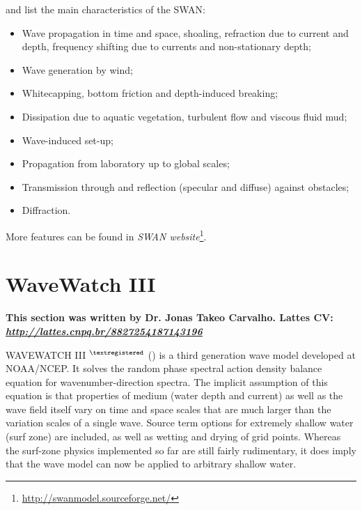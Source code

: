 \noindent \textcite{Dasilva2013} and \textcite{Booij1999,Booij1996} list the main characteristics of the SWAN:
\bigskip

\begin{itemize}
\item Wave propagation in time and space, shoaling, refraction due to current and depth, frequency shifting due to currents and non-stationary depth;
\item Wave generation by wind;
\item Whitecapping, bottom friction and depth-induced breaking;
\item Dissipation due to aquatic vegetation, turbulent flow and viscous fluid mud;
\item Wave-induced set-up;
\item Propagation from laboratory up to global scales;
\item Transmission through and reflection (specular and diffuse) against obstacles;
\item Diffraction.
\end{itemize}
\bigskip

More features can be found in \textcolor{bleu_cite}{\textit{SWAN website}\footnote{\textcolor{bleu_cite}{\href{http://swanmodel.sourceforge.net/}{http://swanmodel.sourceforge.net/}}}}.



\section{WaveWatch III}\label{ww3secao}
\bigskip

\noindent \textbf{This section was written by Dr. Jonas Takeo Carvalho.  \newline Lattes CV: \textit{\textcolor{bleu_cite}{\href{http://lattes.cnpq.br/8827254187143196}{http://lattes.cnpq.br/8827254187143196}}}} 
\bigskip

\noindent WAVEWATCH III $^{\tiny{\textregistered}}$ (\cite{Tolman1997,Tolman1999,Tolman2009,Tolman2014,WW32016}) is a third generation wave model developed at NOAA/NCEP.  
It solves the random phase spectral action density balance equation for wavenumber-direction spectra. The implicit assumption of this equation is that 
properties of medium (water depth and current) as well as the wave field itself vary on time and space scales that are much larger than the variation 
scales of a single wave. Source term options for extremely shallow water (surf zone) are included, as well as wetting and drying of grid points. 
Whereas the surf-zone physics implemented so far are still fairly rudimentary, it does imply that the wave model can now be applied to arbitrary
shallow water. 
\bigskip

